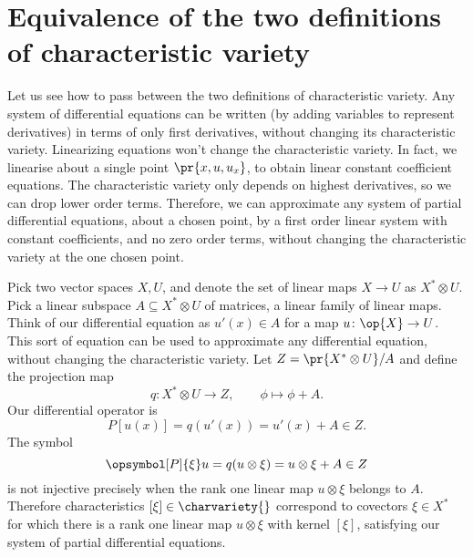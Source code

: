 \section{Equivalence of the two definitions of characteristic variety}
Let us see how to pass between the two definitions of characteristic variety. 
Any system of differential equations can be written (by adding variables to represent derivatives) in terms of only first derivatives, without changing its characteristic variety. 
Linearizing equations won't change the characteristic variety. 
In fact, we linearise about a single point \(\pr{x,u,u_x}\), to obtain linear constant coefficient equations. 
The characteristic variety only depends on highest derivatives, so we can drop lower order terms. 
Therefore, we can approximate any system of partial differential equations, about a chosen point, by a first order linear system with constant coefficients, and no zero order terms, without changing the characteristic variety at the one chosen point.

Pick two vector spaces \(X, U\), and denote the set of linear maps \(X \to U\) as \(X^* \otimes U\).
Pick a linear subspace \(A \subseteq X^* \otimes U\) of matrices, a linear family of linear maps. 
Think of our differential equation as \(u'(x) \in A\) for a map \(u \colon \op{X} \to U\).
This sort of equation can be used to approximate any differential equation, without changing the characteristic variety.
Let \(Z = \pr{X^* \otimes U}/A\) and define the projection map
\[
q \colon X^* \otimes U \to Z, \qquad \phi \mapsto \phi + A.
\]
Our differential operator is
\[
P \left [ u (x) \right ] = q(u'(x)) = u'(x) + A \in Z.
\]
The symbol
\[
\opsymbol[P]{\xi} u = q( u \otimes \xi ) = u \otimes \xi + A \in Z
\]
is not injective precisely when the rank one linear map \(u \otimes \xi\) belongs to \(A\).
Therefore characteristics \([\xi] \in \charvariety{}\) correspond to covectors \(\xi \in X^*\) for which there is a rank one linear map \(u \otimes \xi\) with kernel \([\xi]\),
satisfying our system of partial differential equations.

